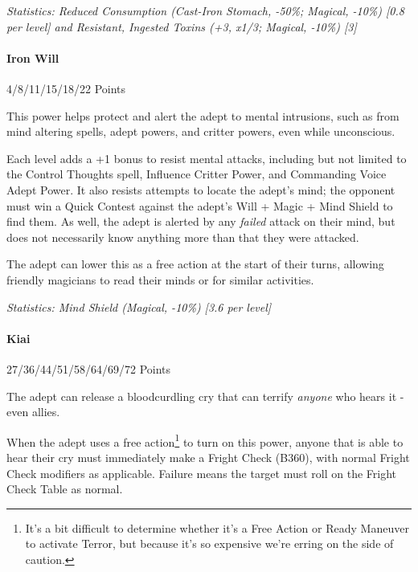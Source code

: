 \begin{multicols}{3}
		\textcolor{OliveGreen}{\textit{Statistics: Reduced Consumption (Cast-Iron Stomach, -50\%; Magical, -10\%) [0.8 per level] and Resistant, Ingested Toxins (+3, x1/3; Magical, -10\%) [3]}}
	
	\paragraph{Iron Will}
	\begin{flushright}
		4/8/11/15/18/22 Points
	\end{flushright}

		This power helps protect and alert the adept to mental intrusions, such as from mind altering spells, adept powers, and critter powers, even while unconscious.
		
		Each level adds a +1 bonus to resist mental attacks, including but not limited to the Control Thoughts spell, Influence Critter Power, and Commanding Voice Adept Power. It also resists attempts to locate the adept's mind; the opponent must win a Quick Contest against the adept's Will + Magic + Mind Shield to find them. As well, the adept is alerted by any \textit{failed} attack on their mind, but does not necessarily know anything more than that they were attacked.
		
		The adept can lower this as a free action at the start of their turns, allowing friendly magicians to read their minds or for similar activities.

		\textcolor{OliveGreen}{\textit{Statistics: Mind Shield (Magical, -10\%) [3.6 per level] }}
	
	\paragraph{Kiai}
	\begin{flushright}
		27/36/44/51/58/64/69/72 Points
	\end{flushright}

		The adept can release a bloodcurdling cry that can terrify \textit{anyone} who hears it - even allies.
		
		When the adept uses a free action\footnote{It's a bit difficult to determine whether it's a Free Action or Ready Maneuver to activate Terror, but because it's so expensive we're erring on the side of caution.} to turn on this power, anyone that is able to hear their cry must immediately make a Fright Check (B360), with normal Fright Check modifiers as applicable. Failure means the target must roll on the Fright Check Table as normal. 
		

\end{multicols}
